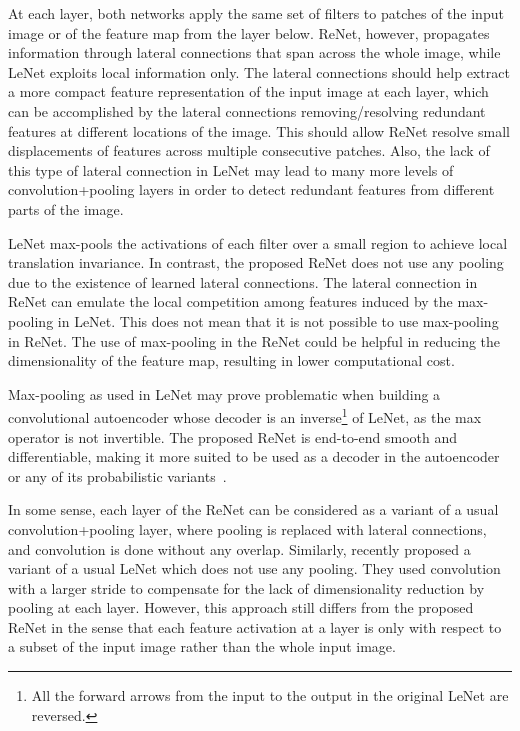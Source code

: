 At each layer, both networks apply the same set of filters to patches of the
input image or of the feature map from the layer below. ReNet, however,
propagates information through lateral connections that span across the whole
image, while LeNet exploits local information only. The lateral connections
should help extract a more compact feature representation of the input image at
each layer, which can be accomplished by the lateral connections
removing/resolving redundant features at different locations of the image. This
should allow ReNet resolve small displacements of features across multiple
consecutive patches. Also, the lack of this type of lateral connection in LeNet
may lead to many more levels of convolution+pooling layers in order to detect
redundant features from different parts of the image.

LeNet max-pools the activations of each filter over a small region to achieve
local translation invariance. In contrast, the proposed ReNet does not use any
pooling due to the existence of learned lateral connections. The lateral
connection in ReNet can emulate the local competition among features induced by
the max-pooling in LeNet.  This does not mean that it is not possible to use
max-pooling in ReNet. The use of max-pooling in the ReNet could be helpful in
reducing the dimensionality of the feature map, resulting in lower computational
cost.

Max-pooling as used in LeNet may prove problematic when building a
convolutional autoencoder whose decoder is an inverse\footnote{
    All the forward arrows from the input to the output in the original LeNet
    are reversed.
}
of LeNet, as the max operator is not invertible. The proposed
ReNet is end-to-end smooth and differentiable, making it more suited to be used
as a decoder in the autoencoder or any of its probabilistic
variants~\citep[see e.g.,][]{Kingma+Welling-ICLR2014}.

In some sense, each layer of the ReNet can be considered as a variant of a
usual convolution+pooling layer, where pooling is replaced with lateral
connections, and convolution is done without any overlap. Similarly,
\citet{Springenberg2014} recently proposed a variant of a usual LeNet which
does not use any pooling.  They used convolution with a larger stride to
compensate for the lack of dimensionality reduction by pooling at each layer.
However, this approach still differs from the proposed ReNet in the sense that
each feature activation at a layer is only with respect to a subset of the
input image rather than the whole input image.

